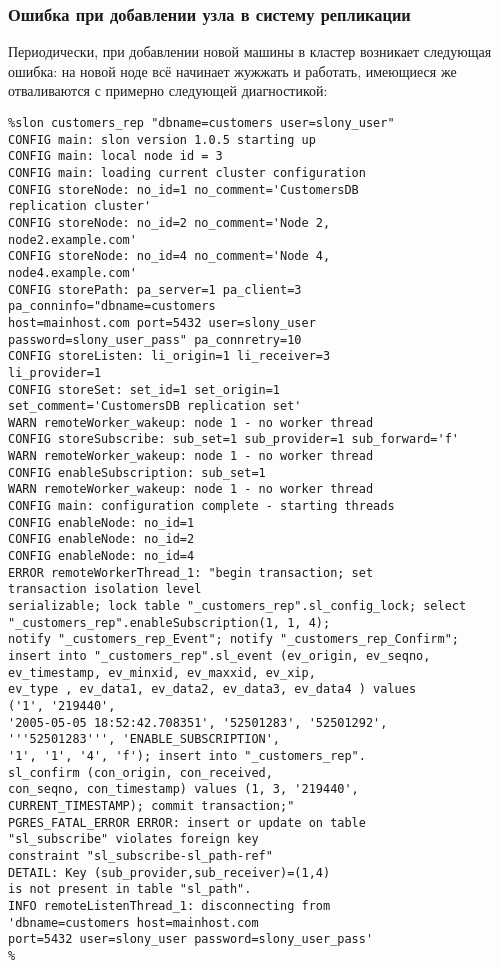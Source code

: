\subsubsection{Ошибка при добавлении узла в систему репликации}
Периодически, при добавлении новой машины в кластер возникает следующая ошибка: на новой ноде всё начинает 
жужжать и работать, имеющиеся же отваливаются с примерно следующей диагностикой:
\begin{verbatim}
%slon customers_rep "dbname=customers user=slony_user"
CONFIG main: slon version 1.0.5 starting up
CONFIG main: local node id = 3
CONFIG main: loading current cluster configuration
CONFIG storeNode: no_id=1 no_comment='CustomersDB 
replication cluster'
CONFIG storeNode: no_id=2 no_comment='Node 2, 
node2.example.com'
CONFIG storeNode: no_id=4 no_comment='Node 4, 
node4.example.com'
CONFIG storePath: pa_server=1 pa_client=3 
pa_conninfo="dbname=customers 
host=mainhost.com port=5432 user=slony_user 
password=slony_user_pass" pa_connretry=10
CONFIG storeListen: li_origin=1 li_receiver=3 
li_provider=1
CONFIG storeSet: set_id=1 set_origin=1 
set_comment='CustomersDB replication set'
WARN remoteWorker_wakeup: node 1 - no worker thread
CONFIG storeSubscribe: sub_set=1 sub_provider=1 sub_forward='f'
WARN remoteWorker_wakeup: node 1 - no worker thread
CONFIG enableSubscription: sub_set=1
WARN remoteWorker_wakeup: node 1 - no worker thread
CONFIG main: configuration complete - starting threads
CONFIG enableNode: no_id=1
CONFIG enableNode: no_id=2
CONFIG enableNode: no_id=4
ERROR remoteWorkerThread_1: "begin transaction; set 
transaction isolation level 
serializable; lock table "_customers_rep".sl_config_lock; select 
"_customers_rep".enableSubscription(1, 1, 4); 
notify "_customers_rep_Event"; notify "_customers_rep_Confirm"; 
insert into "_customers_rep".sl_event (ev_origin, ev_seqno, 
ev_timestamp, ev_minxid, ev_maxxid, ev_xip, 
ev_type , ev_data1, ev_data2, ev_data3, ev_data4 ) values 
('1', '219440', 
'2005-05-05 18:52:42.708351', '52501283', '52501292', 
'''52501283''', 'ENABLE_SUBSCRIPTION', 
'1', '1', '4', 'f'); insert into "_customers_rep".
sl_confirm (con_origin, con_received, 
con_seqno, con_timestamp) values (1, 3, '219440', 
CURRENT_TIMESTAMP); commit transaction;" 
PGRES_FATAL_ERROR ERROR: insert or update on table 
"sl_subscribe" violates foreign key 
constraint "sl_subscribe-sl_path-ref"
DETAIL: Key (sub_provider,sub_receiver)=(1,4) 
is not present in table "sl_path".
INFO remoteListenThread_1: disconnecting from 
'dbname=customers host=mainhost.com 
port=5432 user=slony_user password=slony_user_pass'
%
\end{verbatim}


